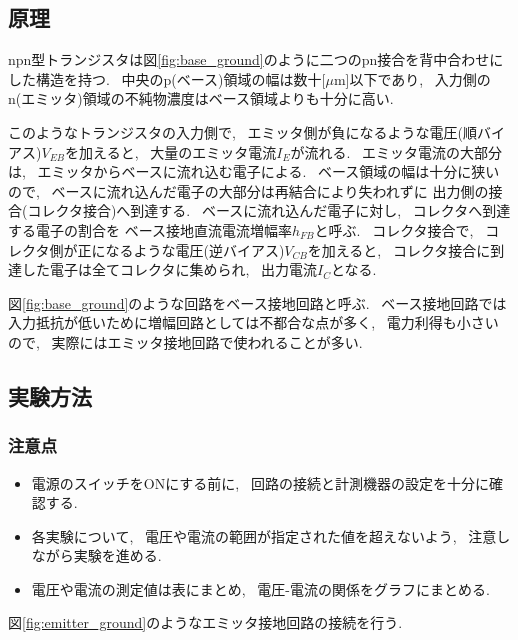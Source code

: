 \documentclass[uplatex,dvipdfmx,a4paper,js=standard, titlepage]{bxjsarticle}
\begin{document}
    \subsection{原理}
        npn型トランジスタは図\ref{fig:base_ground}のように二つのpn接合を背中合わせにした構造を持つ.
        ~中央のp(ベース)領域の幅は数十[$\mu$m]以下であり, ~入力側のn(エミッタ)領域の不純物濃度はベース領域よりも十分に高い.

        このようなトランジスタの入力側で, ~エミッタ側が負になるような電圧(順バイアス)$V_{EB}$を加えると,
        ~大量のエミッタ電流$I_E$が流れる. ~エミッタ電流の大部分は, ~エミッタからベースに流れ込む電子による.
        ~ベース領域の幅は十分に狭いので, ~ベースに流れ込んだ電子の大部分は再結合により失われずに
        出力側の接合(コレクタ接合)へ到達する. ~ベースに流れ込んだ電子に対し, ~コレクタへ到達する電子の割合を
        ベース接地直流電流増幅率$h_{FB}$と呼ぶ. ~コレクタ接合で,
        ~コレクタ側が正になるような電圧(逆バイアス)$V_{CB}$を加えると,
        ~コレクタ接合に到達した電子は全てコレクタに集められ, ~出力電流$I_C$となる.

        図\ref{fig:base_ground}のような回路をベース接地回路と呼ぶ.
        ~ベース接地回路では入力抵抗が低いために増幅回路としては不都合な点が多く, ~電力利得も小さいので,
        ~実際にはエミッタ接地回路で使われることが多い.

    \subsection{実験方法}
        \subsubsection{注意点}
            \begin{itemize}
                \item 電源のスイッチをONにする前に, ~回路の接続と計測機器の設定を十分に確認する.
                \item 各実験について, ~電圧や電流の範囲が指定された値を超えないよう,
                    ~注意しながら実験を進める.
                \item 電圧や電流の測定値は表にまとめ, ~電圧-電流の関係をグラフにまとめる.
            \end{itemize}

        図\ref{fig:emitter_ground}のようなエミッタ接地回路の接続を行う.
\end{document}
